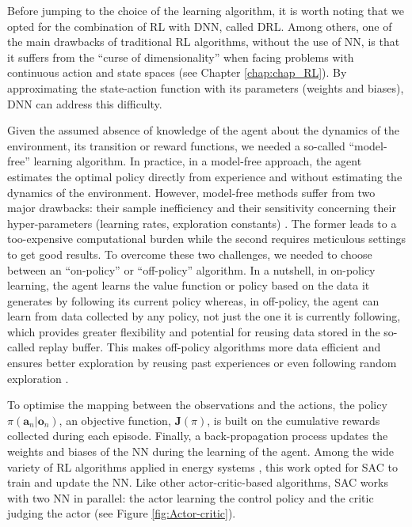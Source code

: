 \newpage
Before jumping to the choice of the learning algorithm, it is worth noting that we opted for the combination of \gls{RL} with \gls{DNN}, called \gls{DRL}. Among others, one of the main drawbacks of traditional \gls{RL} algorithms, \ie without the use of \gls{NN},  is that it suffers from the ``curse of dimensionality'' when facing problems with continuous action and state spaces (see Chapter \ref{chap:chap_RL}). By approximating the state-action function with its parameters (\ie weights and biases), \gls{DNN} can address this difficulty. 

Given the assumed absence of knowledge of the agent about the dynamics of the environment, \ie its transition or reward functions, we needed a so-called ``model-free'' learning algorithm. In practice, in a model-free approach, the agent estimates the optimal policy directly from experience and without estimating the dynamics of the environment. However, model-free methods suffer from two major drawbacks: their sample inefficiency and their sensitivity concerning their hyper-parameters (\eg learning rates, exploration constants) \cite{haarnoja2018soft}. The former leads to a too-expensive computational burden while the second requires meticulous settings to get good results.  To overcome these two challenges, we needed to choose between an ``on-policy'' or ``off-policy'' algorithm. In a nutshell, in on-policy learning, the agent learns the value function or policy based on the data it generates by following its current policy whereas, in off-policy, the agent can learn from data collected by any policy, not just the one it is currently following, which provides greater flexibility and potential for reusing data stored in the so-called replay buffer. This makes off-policy algorithms more data efficient and ensures better exploration by reusing past experiences or even following random exploration \cite{haarnoja2018soft}.

To optimise the mapping between the observations and the actions, the policy $\pi\left(\bm{a}_n | \bm{o}_n\right)$, an objective function, $\bm{J}(\pi)$, is built on the cumulative rewards collected during each episode. Finally, a back-propagation process updates the weights and biases of the \gls{NN} during the learning of the agent. Among the wide variety of \gls{RL} algorithms applied in energy systems \cite{perera2021applications}, this work opted for \gls{SAC} \cite{haarnoja2018soft} to train and update the \gls{NN}.  Like other actor-critic-based algorithms, \gls{SAC} works with two \gls{NN} in parallel: the actor learning the control policy and the critic judging the actor (see Figure \ref{fig:Actor-critic}).

